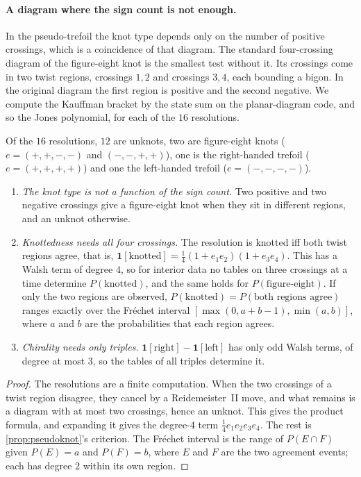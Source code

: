 \documentclass[11pt]{article}
\theoremstyle{definition}\newtheorem{definition}[theorem]{Definition}\newtheorem{remark}[theorem]{Remark}\newtheorem{example}[theorem]{Example}\newtheorem{problem}[theorem]{Open problem}\crefname{problem}{Problem}{Problems}
\begin{document}
\paragraph{A diagram where the sign count is not enough.} In the pseudo-trefoil the knot type depends only on the number of positive crossings, which is a coincidence of that diagram. The standard four-crossing diagram of the figure-eight knot is the smallest test without it. Its crossings come in two twist regions, crossings $1,2$ and crossings $3,4$, each bounding a bigon. In the original diagram the first region is positive and the second negative. We compute the Kauffman bracket by the state sum on the planar-diagram code, and so the Jones polynomial, for each of the $16$ resolutions.

\begin{proposition}\label{prop:figeight}
Of the $16$ resolutions, $12$ are unknots, two are figure-eight knots ($e=(+,+,-,-)$ and $(-,-,+,+)$), one is the right-handed trefoil ($e=(+,+,+,+)$) and one the left-handed trefoil ($e=(-,-,-,-)$).
\begin{enumerate}
\item[(1)] \emph{The knot type is not a function of the sign count.} Two positive and two negative crossings give a figure-eight knot when they sit in different regions, and an unknot otherwise.
\item[(2)] \emph{Knottedness needs all four crossings.} The resolution is knotted iff both twist regions agree, that is, $\mathbf 1[\text{knotted}]=\tfrac14(1+e_1e_2)(1+e_3e_4)$. This has a Walsh term of degree $4$, so for interior data no tables on three crossings at a time determine $P(\text{knotted})$, and the same holds for $P(\text{figure-eight})$. If only the two regions are observed, $P(\text{knotted})=P(\text{both regions agree})$ ranges exactly over the Fr\'echet interval $[\max(0,a+b-1),\min(a,b)]$, where $a$ and $b$ are the probabilities that each region agrees.
\item[(3)] \emph{Chirality needs only triples.} $\mathbf 1[\text{right}]-\mathbf 1[\text{left}]$ has only odd Walsh terms, of degree at most $3$, so the tables of all triples determine it.
\end{enumerate}
\end{proposition}

\begin{proof}
The resolutions are a finite computation. When the two crossings of a twist region disagree, they cancel by a Reidemeister~II move, and what remains is a diagram with at most two crossings, hence an unknot. This gives the product formula, and expanding it gives the degree-$4$ term $\tfrac14e_1e_2e_3e_4$. The rest is \cref{prop:pseudoknot}'s criterion. The Fr\'echet interval is the range of $P(E\cap F)$ given $P(E)=a$ and $P(F)=b$, where $E$ and $F$ are the two agreement events; each has degree $2$ within its own region.
\end{proof}
\end{document}
